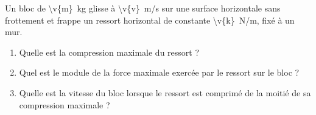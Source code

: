 Un bloc de \qty{\v{m}}{kg} glisse à \qty{\v{v}}{m/s} sur une surface horizontale sans frottement et frappe un ressort horizontal de constante \qty{\v{k}}{N/m}, fixé à un mur.

\begin{enumerate}[label=\alph*)]
    \item Quelle est la compression maximale du ressort ?
    \item Quel est le module de la force maximale exercée par le ressort sur le bloc ?
    \item Quelle est la vitesse du bloc lorsque le ressort est comprimé de la moitié de sa compression maximale ?
\end{enumerate}
